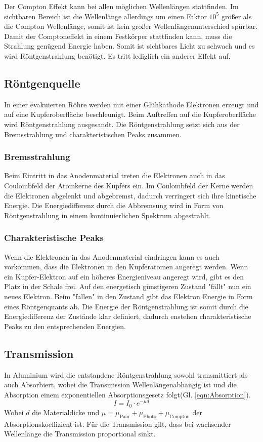 Der Compton Effekt kann bei allen möglichen Wellenlängen stattfinden.
Im sichtbaren Bereich ist die Wellenlänge allerdings um einen Faktor $10^5$ größer als die Compton Wellenlänge, somit ist kein großer Wellenlängenunterschied spürbar.
Damit der Comptoneffekt in einem Festkörper stattfinden kann, muss die Strahlung genügend Energie haben. Somit ist sichtbares Licht zu schwach und es wird Röntgenstrahlung benötigt.
Es tritt lediglich ein anderer Effekt auf.


\subsection{Röntgenquelle}
In einer evakuierten Röhre werden mit einer Glühkathode Elektronen erzeugt und auf eine Kupferoberfläche beschleunigt.
Beim Auftreffen auf die Kupferoberfläche wird Röntgenstrahlung ausgesandt. Die Röntgenstrahlung setzt sich aus der Bremsstrahlung und charakteristischen Peaks zusammen.

\subsubsection{Bremsstrahlung}
Beim Eintritt in das Anodenmaterial treten die Elektronen auch in das Coulombfeld der Atomkerne des Kupfers ein.
Im Coulombfeld der Kerne werden die Elektronen abgelenkt und abgebremst, dadurch verringert sich ihre kinetische Energie.
Die Energiedifferenz durch die Abbremsung wird in Form von Röntgenstrahlung in einem kontinuierlichen Spektrum abgestrahlt.

\subsubsection{Charakteristische Peaks}
Wenn die Elektronen in das Anodenmaterial eindringen kann es auch vorkommen, dass die Elektronen in den Kupferatomen angeregt werden.
Wenn ein Kupfer-Elektron auf ein höheres Energieniveau angeregt wird, gibt es den Platz in der Schale frei. Auf den energetisch günstigeren Zustand "fällt" nun ein neues Elektron.
Beim "fallen" in den Zustand gibt das Elektron Energie in Form eines Röntgenquants ab.
Die Energie der Röntgenstrahlung ist somit durch die Energiedifferenz der Zustände klar definiert, dadurch enstehen charakteristische Peaks zu den entsprechenden Energien.

\subsection{Transmission}
In Aluminium wird die entstandene Röntgenstrahlung sowohl transmittiert als auch Absorbiert, wobei die Transmission Wellenlängenabhängig ist und die Absorption einem exponentiellen Absorptionsgesetz folgt(Gl. \ref{eqn:Absorption}).
\begin{equation}
    I = I_0 \cdot e^{-\mu d} \label{eqn:Absorption}
\end{equation}
Wobei $d$ die Materialdicke und $\mu = \mu_{\text{Paar}}+\mu_{\text{Photo}}+\mu_{\text{Compton}}$ der Absorptionskoeffizient ist.
Für die Transmission gilt, dass bei wachsender Wellenlänge die Transmission proportional sinkt.

